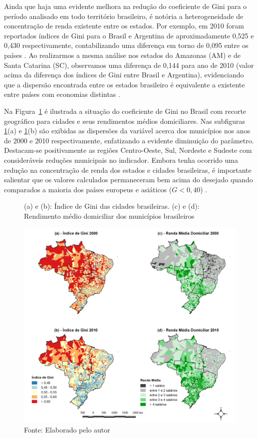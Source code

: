 Ainda que haja uma evidente melhora na redução do coeficiente de Gini para o período analisado em todo território brasileiro, é notória a heterogeneidade de concentração de renda existente entre os estados. Por exemplo, em 2010 foram reportados índices de Gini para o Brasil e Argentina de aproximadamente 0,525 e 0,430 respectivamente, contabilizando uma diferença em torno de 0,095 entre os países \cite{cap04_ref1}. Ao realizarmos a mesma análise nos estados do Amazonas (AM) e de Santa Catarina (SC), observamos uma diferença de 0,144 para ano de 2010 (valor acima da diferença dos índices de Gini entre Brasil e Argentina), evidenciando que a dispersão encontrada entre os estados brasileiro é equivalente a existente entre países com economias distintas \cite{cap04_ref11}.

Na Figura~\ref{fig:cap04:ginicidades} é ilustrada a situação do coeficiente de Gini no Brasil com recorte geográfico para cidades e seus rendimentos médios domiciliares. Nas subfiguras \ref{fig:cap04:ginicidades}(a) e \ref{fig:cap04:ginicidades}(b) são exibidas as dispersões da variável acerca dos municípios nos anos de 2000 e 2010 respectivamente, enfatizando a evidente diminuição do parâmetro. Destacam-se positivamente as regiões Centro-Oeste, Sul, Nordeste e Sudeste com consideráveis reduções municipais no indicador. Embora tenha ocorrido uma redução na concentração de renda dos estados e cidades brasileiras, é importante salientar que os valores calculados permaneceram bem acima do desejado quando comparados a maioria dos países europeus e asiáticos ($G < 0,40$) \cite{cap04_ref1}.

\begin{figure}[!ht]
    \centering
    \caption{(a) e (b): Índice de Gini das cidades brasileiras. (c) e (d): Rendimento médio domiciliar dos municípios brasileiros}
    \includegraphics[width=\textwidth]{figs/cap04_mapa_gini_renda.png}
    \caption*{\footnotesize{Fonte: Elaborado pelo autor}}
    \label{fig:cap04:ginicidades}
\end{figure}

